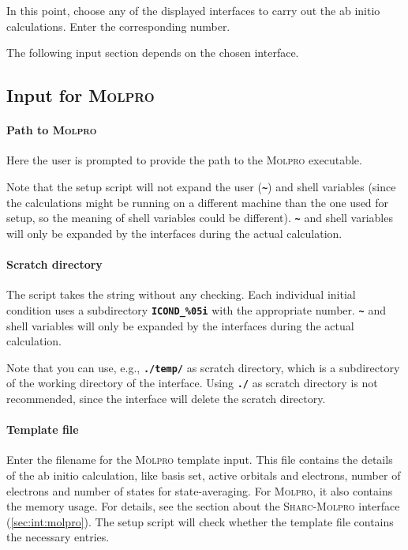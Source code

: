 \documentclass[a4paper,11pt,DIV=15,openany,twoside=false]{scrbook}
\newcommand{\sharc}{\textsc{Sharc}}
\newcommand{\ttt}[1]{\textbf{\texttt{#1}}}
\begin{document}
In this point, choose any of the displayed interfaces to carry out the ab initio calculations. Enter the corresponding number. 

The following input section depends on the chosen interface.

\subsection{Input for \textsc{Molpro}}\label{sec:setup_init.py:molpro}

\paragraph{Path to \textsc{Molpro}}

Here the user is prompted to provide the path to the \textsc{Molpro} executable. 

Note that the setup script will not expand the user (\ttt{\textasciitilde}) and shell variables (since the calculations might be running on a different machine than the one used for setup, so the meaning of shell variables could be different). \ttt{\textasciitilde} and shell variables will only be expanded by the interfaces during the actual calculation.

\paragraph{Scratch directory}

The script takes the string without any checking. Each individual initial condition uses a subdirectory \ttt{ICOND\_\%05i} with the appropriate number. \ttt{\textasciitilde} and shell variables will only be expanded by the interfaces during the actual calculation.

Note that you can use, e.g., \ttt{./temp/} as scratch directory, which is a subdirectory of the working directory of the interface. Using \ttt{./} as scratch directory is not recommended, since the interface will delete the scratch directory.

\paragraph{Template file}

Enter the filename for the \textsc{Molpro} template input. This file contains the details of the ab initio calculation, like basis set, active orbitals and electrons, number of electrons and number of states for state-averaging. For \textsc{Molpro}, it also contains the memory usage. For details, see the section about the \sharc-\textsc{Molpro} interface (\ref{sec:int:molpro}). The setup script will check whether the template file contains the necessary entries. 
\end{document}
